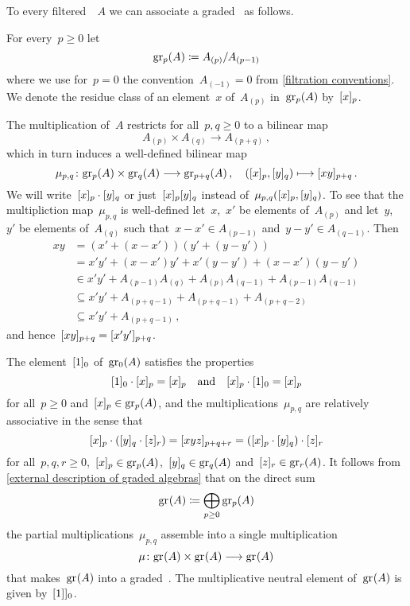 \begin{construction}
	\label{construction of associated graded}
	To every filtered~{\algebra{$\kf$}}~$A$ we can associate a graded~{\algebra{$\kf$}} as follows.

	For every~$p \geq 0$ let
	\[
		\gr[p](A)
		\defined
		A_{(p)} / A_{(p-1)}
	\]
	where we use for~$p = 0$ the convention~$A_{(-1)} = 0$ from \cref{filtration conventions}.
	We denote the residue class of an element~$x$ of~$A_{(p)}$ in~$\gr[p](A)$ by~$\lbrack x\rbrack_p$.
	
	The multiplication of~$A$ restricts for all~$p, q \geq 0$ to a bilinear map
	\[
		A_{(p)} \times A_{(q)} \to A_{(p+q)} \,,
	\]
	which in turn induces a well-defined bilinear map
	\[
		\mu_{p,q}
		\colon
		\gr[p](A) \times \gr[q](A)
		\to
		\gr[p+q](A) \,,
		\quad
		(\fclass{x}_p, \fclass{y}_q)
		\mapsto
		\fclass{xy}_{p+q}  \,.
	\]
	We will write~$\lbrack x\rbrack_p \cdot \lbrack y\rbrack_q$ or just~$\lbrack x\rbrack_p \lbrack y\rbrack_q$ instead of~$\mu_{p,q}(\lbrack x\rbrack_p, \lbrack y\rbrack_q)$.
	To see that the multipliction map~$\mu_{p,q}$ is well-defined let~$x$,~$x'$ be elements of~$A_{(p)}$ and let~$y$,~$y'$ be elements of~$A_{(q)}$ such that~$x - x ' \in A_{(p-1)}$ and~$y - y' \in A_{(q-1)}$.
	Then
	\begin{align*}
		x y
		&=
		(x' + (x - x')) (y' + (y - y'))
		\\
		&=
		x' y' + (x - x') y' + x' (y - y') + (x - x')(y - y')
		\\
		&\in
		x' y' + A_{(p-1)} A_{(q)} + A_{(p)} A_{(q-1)} + A_{(p-1)} A_{(q-1)}
		\\
		&\subseteq
		x' y' + A_{(p+q-1)} + A_{(p+q-1)} + A_{(p+q-2)}
		\\
		&\subseteq
		x' y' + A_{(p+q-1)} \,,
	\end{align*}
	and hence~$\lbrack xy\rbrack_{p+q} = \lbrack x'y'\rbrack_{p+q}$.
	
	The element~$\lbrack 1 \rbrack_0$ of~$\gr[0](A)$ satisfies the properties
	\[
		\lbrack1\rbrack_0 \cdot \lbrack x\rbrack_p = \lbrack x\rbrack_p
		\quad\text{and}\quad
		\lbrack x\rbrack_p \cdot \lbrack1\rbrack_0 = \lbrack x\rbrack_p
	\]
	 for all~$p \geq 0$ and~$\fclass{x}_p \in \gr[p](A)$, and the multiplications~$\mu_{p,q}$ are relatively associative in the sense that
	\[
		\lbrack x\rbrack_p \cdot (\lbrack y\rbrack_q \cdot \lbrack z\rbrack_r)
		=
		\lbrack xyz \rbrack_{p+q+r}
		=
		(\lbrack x\rbrack_p \cdot \lbrack y\rbrack_q) \cdot \lbrack z\rbrack_r
	\]
	for all~$p, q, r \geq 0$,~$\fclass{x}_p \in \gr[p](A)$,~$\fclass{y}_q \in \gr[q](A)$ and~$\fclass{z}_r \in \gr[r](A)$.
	It follows from \cref{external description of graded algebras} that on the direct sum
	\[
		\gr(A)
		\defined
		\bigoplus_{p \geq 0} \gr[p](A)
	\]
	the partial multiplications~$\mu_{p,q}$ assemble into a single multiplication
	\[
		\mu
		\colon
		\gr(A) \times \gr(A)
		\to
		\gr(A)
	\]
	that makes~$\gr(A)$ into a graded~{\algebra{$\kf$}}.
	The multiplicative neutral element of~$\gr(A)$ is given by~$\lbrack1]\rbrack_0$.
\end{construction}


